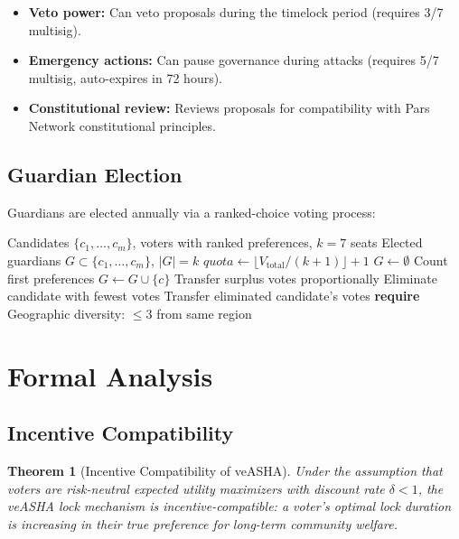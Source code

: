 \documentclass[11pt,a4paper]{article}
\newtheorem{theorem}{Theorem}
\begin{document}
\begin{itemize}
    \item \textbf{Veto power:} Can veto proposals during the timelock period (requires 3/7 multisig).
    \item \textbf{Emergency actions:} Can pause governance during attacks (requires 5/7 multisig, auto-expires in 72 hours).
    \item \textbf{Constitutional review:} Reviews proposals for compatibility with Pars Network constitutional principles.
\end{itemize}

\subsection{Guardian Election}

Guardians are elected annually via a ranked-choice voting process:

\begin{algorithm}[H]
\caption{Guardian Election (STV)}
\label{alg:guardian}
\begin{algorithmic}[1]
\Require Candidates $\{c_1, \ldots, c_m\}$, voters with ranked preferences, $k = 7$ seats
\Ensure Elected guardians $G \subset \{c_1, \ldots, c_m\}$, $|G| = k$
\State $\mathit{quota} \leftarrow \lfloor V_{\text{total}} / (k + 1) \rfloor + 1$ 
\State $G \leftarrow \emptyset$
    \State Count first preferences
        \State $G \leftarrow G \cup \{c\}$
        \State Transfer surplus votes proportionally
    \Else
        \State Eliminate candidate with fewest votes
        \State Transfer eliminated candidate's votes
    \EndIf
\EndWhile
\State \textbf{require} Geographic diversity: $\leq 3$ from same region
\end{algorithmic}
\end{algorithm}

\section{Formal Analysis}

\subsection{Incentive Compatibility}

\begin{theorem}[Incentive Compatibility of veASHA]
Under the assumption that voters are risk-neutral expected utility maximizers with discount rate $\delta < 1$, the veASHA lock mechanism is incentive-compatible: a voter's optimal lock duration is increasing in their true preference for long-term community welfare.
\end{theorem}
\end{document}
